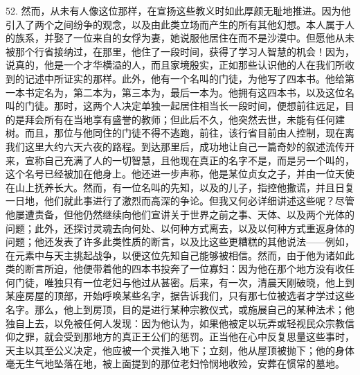 52. 然而，从未有人像这位那样，在宣扬这些教义时如此厚颜无耻地推进。因为他引入了两个之间纷争的观念，以及由此类立场而产生的所有其他幻想。本人属于人的族系，并娶了一位来自的女俘为妻，她说服他居住在而不是沙漠中。但愿他从未被那个行省接纳过，在那里，他住了一段时间，获得了学习人智慧的机会！因为，说真的，他是一个才华横溢的人，而且家境殷实，正如那些认识他的人在我们所收到的记述中所证实的那样。此外，他有一个名叫的门徒，为他写了四本书。他给第一本书定名为，第二本为，第三本为，最后一本为。他拥有这四本书，以及这位名叫的门徒。那时，这两个人决定单独一起居住相当长一段时间，便想前往远足，目的是拜会所有在当地享有盛誉的教师；但此后不久，他突然去世，未能有任何建树。而且，那位与他同住的门徒不得不逃跑，前往，该行省目前由人控制，现在离我们这里大约六天六夜的路程。到达那里后，成功地让自己一篇奇妙的叙述流传开来，宣称自己充满了人的一切智慧，且他现在真正的名字不是，而是另一个叫的，这个名号已经被加在他身上。他还进一步声称，他是某位贞女之子，并由一位天使在山上抚养长大。然而，有一位名叫的先知，以及的儿子，指控他撒谎，并且日复一日地，他们就此事进行了激烈而高深的争论。但我又何必详细讲述这些呢？尽管他屡遭责备，但他仍然继续向他们宣讲关于世界之前之事、天体、以及两个光体的问题；此外，还探讨灵魂去向何处、以何种方式离去，以及以何种方式重返身体的问题；他还发表了许多此类性质的断言，以及比这些更糟糕的其他说法——例如，在元素中与天主挑起战争，以便这位先知自己能够被相信。然而，由于他为诸如此类的断言所迫，他便带着他的四本书投奔了一位寡妇：因为他在那个地方没有收任何门徒，唯独只有一位老妇与他过从甚密。后来，有一次，清晨天刚破晓，他上到某座房屋的顶部，开始呼唤某些名字，据告诉我们，只有那七位被选者才学过这些名字。那么，他上到房顶，目的是进行某种宗教仪式，或施展自己的某种法术；他独自上去，以免被任何人发现：因为他认为，如果他被定以玩弄或轻视民众宗教信仰之罪，就会受到那地方的真正王公们的惩罚。正当他在心中反复思量这些事时，天主以其至公义决定，他应被一个灵推入地下；立刻，他从屋顶被抛下；他的身体毫无生气地坠落在地，被上面提到的那位老妇怜悯地收殓，安葬在惯常的墓地。\par


